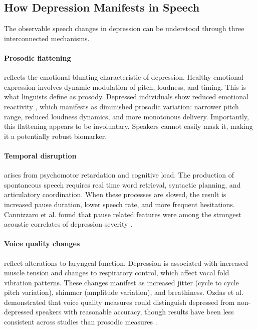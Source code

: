 \subsection{How Depression Manifests in Speech}

The observable speech changes in depression can be understood through three interconnected mechanisms.

\paragraph{Prosodic flattening} reflects the emotional blunting characteristic of depression. Healthy emotional expression involves dynamic modulation of pitch, loudness, and timing. This is what linguists define as prosody. Depressed individuals show reduced emotional reactivity \cite{Bylsma2008}, which manifests as diminished prosodic variation: narrower pitch range, reduced loudness dynamics, and more monotonous delivery. Importantly, this flattening appears to be involuntary. Speakers cannot easily mask it, making it a potentially robust biomarker.

\paragraph{Temporal disruption} arises from psychomotor retardation and cognitive load. The production of spontaneous speech requires real time word retrieval, syntactic planning, and articulatory coordination. When these processes are slowed, the result is increased pause duration, lower speech rate, and more frequent hesitations. Cannizzaro et al. found that pause related features were among the strongest acoustic correlates of depression severity \cite{Cannizzaro2004}.

\paragraph{Voice quality changes} reflect alterations to laryngeal function. Depression is associated with increased muscle tension and changes to respiratory control, which affect vocal fold vibration patterns. These changes manifest as increased jitter (cycle to cycle pitch variation), shimmer (amplitude variation), and breathiness. Ozdas et al. demonstrated that voice quality measures could distinguish depressed from non-depressed speakers with reasonable accuracy, though results have been less consistent across studies than prosodic measures \cite{Ozdas2004}.

